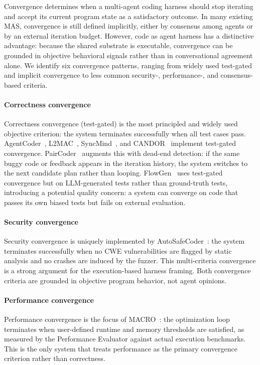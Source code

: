 Convergence determines when a multi-agent coding harness should
stop iterating and accept its current program state as a
satisfactory outcome. In many existing MAS, convergence is still
defined implicitly, either by consensus among agents or by an
external iteration budget. However, code as agent harness has a
distinctive advantage: because the shared substrate is
executable, convergence can be grounded in objective behavioral
signals rather than in conversational agreement alone. We identify six convergence patterns, ranging from widely used test-gated and implicit convergence to less common security-, performance-, and consensus-based criteria.

\paragraph{Correctness convergence} Correctness convergence
(test-gated) is the most principled and widely used objective
criterion: the system terminates successfully when all test cases
pass. AgentCoder~\cite{huang2023agentcoder},
L2MAC~\cite{Holt2023L2MAC}, SyncMind~\cite{Guo2025SyncMind}, and
CANDOR~\cite{Xu2025Hallucination} implement test-gated
convergence. PairCoder~\cite{Zhang2024PairProgramming} augments
this with dead-end detection: if the same buggy code or feedback
appears in the iteration history, the system switches to the next
candidate plan rather than looping. FlowGen~\cite{Lin2025Soen101}
uses test-gated convergence but on LLM-generated tests rather
than ground-truth tests, introducing a potential quality concern:
a system can converge on code that passes its own biased tests
but fails on external evaluation.

\paragraph{Security convergence} Security convergence is uniquely
implemented by AutoSafeCoder~\cite{Nunez2024AutoSafeCoder}: the
system terminates successfully when no CWE vulnerabilities are
flagged by static analysis and no crashes are induced by the
fuzzer. This multi-criteria convergence is a strong argument for
the execution-based harness framing. Both convergence criteria
are grounded in objective program behavior, not agent opinions.

\paragraph{Performance convergence} Performance convergence is the
focus of MACRO~\cite{Rahman2025MACRO}: the optimization loop
terminates when user-defined runtime and memory thresholds are
satisfied, as measured by the Performance Evaluator against
actual execution benchmarks. This is the only system that treats
performance as the primary convergence criterion rather than
correctness.


